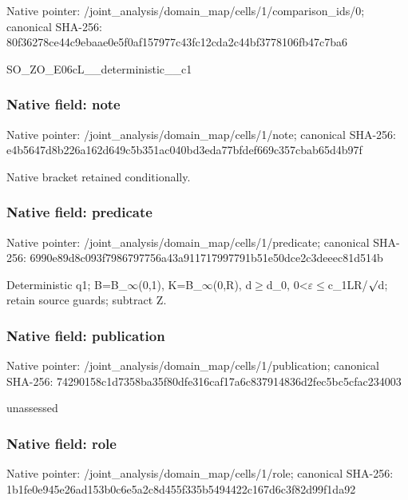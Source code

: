 \documentclass[10pt,a4paper]{article}
\begin{document}
Native pointer: /joint\_analysis/domain\_m\allowbreak{}ap/cells/1/comparison\_id\allowbreak{}s/0; canonical SHA-256: 80f36278ce44c9ebaae0e5f0\allowbreak{}af157977c43fc12cda2c44bf\allowbreak{}3778106fb47c7ba6


SO\_ZO\_E06cL\_\_deterministic\_\_c1


\subsubsection{Native field: note}


Native pointer: /joint\_analysis/domain\_map/cells/1/note; canonical SHA-256: e4b5647d8b226a162d649c5b\allowbreak{}351ac040bd3eda77bfdef669\allowbreak{}c357cbab65d4b97f


Native bracket retained conditionally.


\subsubsection{Native field: predicate}


Native pointer: /joint\_analysis/domain\_m\allowbreak{}ap/cells/1/predicate; canonical SHA-256: 6990e89d8c093f7986797756\allowbreak{}a43a911717997791b51e50dc\allowbreak{}e2c3deeec81d514b


Deterministic q1; B=B\_\ensuremath{\infty}(0,1), K=B\_\ensuremath{\infty}(0,R), d\ensuremath{\ge}d\_0, 0<\ensuremath{\varepsilon}\ensuremath{\le}c\_1LR/\ensuremath{\sqrt{\vphantom{x}}}d; retain source guards; subtract Z.


\subsubsection{Native field: publication}


Native pointer: /joint\_analysis/domain\_m\allowbreak{}ap/cells/1/publication; canonical SHA-256: 74290158c1d7358ba35f80df\allowbreak{}e316caf17a6c837914836d2f\allowbreak{}ec5bc5cfac234003


unassessed


\subsubsection{Native field: role}


Native pointer: /joint\_analysis/domain\_map/cells/1/role; canonical SHA-256: 1b1fe0e945e26ad153b0c6e5\allowbreak{}a2c8d455f335b5494422c167\allowbreak{}d6c3f82d99f1da92
\end{document}
